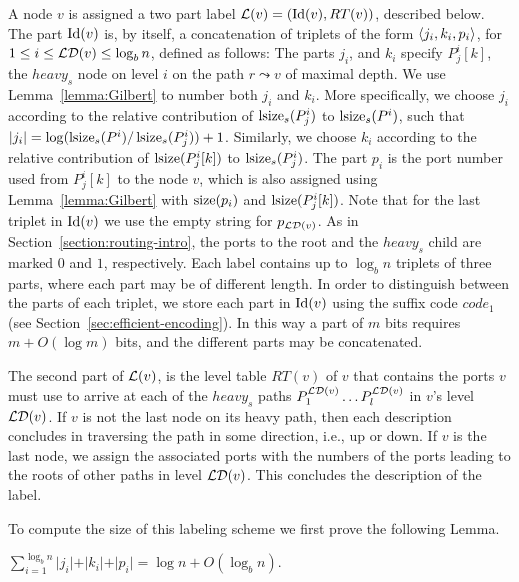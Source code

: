 A node $v$ is assigned a two part label $ \mathcal{L}(v)= (\operatorname{Id}(v),RT(v))$, described below.
The part $\operatorname{Id}(v)$ is, by itself, a  concatenation of triplets  of the form $\left \langle j_i,k_i,p_i \right \rangle $, for $ 1 \leq i \leq   \mathcal{LD}(v) \leq \log_b n$, defined as follows:
 The parts $j_i$,  and $k_i$  specify $P^i_j[k]$, the $heavy_{s}$ node on level $i$ on the path  $r \leadsto v$ of maximal depth.
 We use Lemma~\ref{lemma:Gilbert} to number both $j_i$ and $k_i$.
 More specifically,  we choose  $j_i$ according to the relative contribution of  $\operatorname{lsize}_s(P^i_j)$ to   $\operatorname{lsize}_s(P^i)$, such that  $\vert j_i \vert = \log (\operatorname{lsize}_s(P^i)/ \operatorname{lsize}_s(P^i_j)) + 1$. Similarly, we choose $k_i$ according to the relative contribution of $\operatorname{lsize}(P^i_j[k])$ to $\operatorname{lsize}_s(P^i_j)$.
The part  $p_i$ is the port number used from $P^i_j[k]$ to the node $v$, which is also assigned using Lemma~\ref{lemma:Gilbert} with $\operatorname{size}(p_i)$ and $\operatorname{lsize}(P^i_j[k])$.
Note that  for the last triplet in $\operatorname{Id}(v)$ we use the empty string for  $p_{ \mathcal{LD}(v)}$. 
As in Section~\ref{section:routing-intro}, the ports to  the root and the $heavy_s$ child are marked $0$ and $1$, respectively.
 Each label contains up to $\log_b n $ triplets of  three parts, where each part may be of different length.
In order to distinguish between the parts of each triplet, we store each part in $\operatorname{Id}(v)$ using  the suffix  code $code_1$ (see Section~\ref{sec:efficient-encoding}).
In this way a part of $m$ bits requires $m + O(\log m )$ bits, and the different parts may be concatenated.

The second part of $ \mathcal{L}(v)$, is the level \routing table $RT(v)$ of $v$ that  contains the  ports  $v$ must use  to arrive at each of the  $heavy_{s}$ paths $P^{ \mathcal{LD}(v)}_1 \dots P^{ \mathcal{LD}(v)}_l$ in $v$'s level $ \mathcal{LD}(v)$.
If $v$ is not the last node on its heavy path, then each  description concludes in traversing the path in some direction, i.e., up or down.
If $v$ is the last node, we assign the associated ports with the numbers of the ports leading to the roots of other paths in level $ \mathcal{LD}(v)$.
This concludes the description of the label.

To compute the size of this labeling scheme we first prove the following Lemma.
\begin{lemma}\label{lemma:tikun}
$\sum_{i=1}^{\log_b n} \vert j_i \vert + \vert k_i \vert + \vert p_i \vert = \log n + O(\log_b n).$
 \end{lemma}
 
